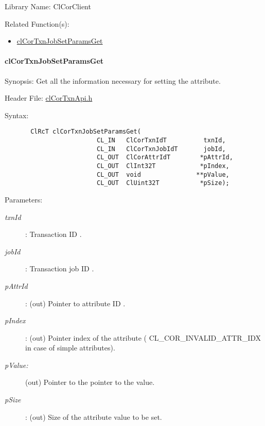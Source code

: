 \begin{Desc}
\item[Library Name:]Cl\-Cor\-Client\end{Desc}
\begin{Desc}
\item[Related Function(s):]\begin{itemize}
\item \hyperlink{group__group13}{cl\-Cor\-Txn\-Job\-Set\-Params\-Get} \end{itemize}
\end{Desc}
\hypertarget{pagecor507}{}\paragraph{cl\-Cor\-Txn\-Job\-Set\-Params\-Get}\label{pagecor507}
\begin{Desc}
\item[Synopsis:]Get all the information necessary for setting the attribute.\end{Desc}
\begin{Desc}
\item[Header File:]\hyperlink{cl_cor_txn_api_8h}{cl\-Cor\-Txn\-Api.h}\end{Desc}
\begin{Desc}
\item[Syntax:]

\footnotesize\begin{verbatim}       ClRcT clCorTxnJobSetParamsGet(
                         CL_IN   ClCorTxnIdT          txnId,
                         CL_IN   ClCorTxnJobIdT       jobId,
                         CL_OUT  ClCorAttrIdT        *pAttrId,
                         CL_OUT  ClInt32T            *pIndex,
                         CL_OUT  void               **pValue,
                         CL_OUT  ClUint32T           *pSize);
\end{verbatim}
\normalsize
\end{Desc}
\begin{Desc}
\item[Parameters:]
\begin{description}
\item[{\em txn\-Id}]: Transaction ID . \item[{\em job\-Id}]: Transaction job ID . \item[{\em p\-Attr\-Id}]: (out) Pointer to attribute ID . \item[{\em p\-Index}]: (out) Pointer index of the attribute ( CL\_\-COR\_\-INVALID\_\-ATTR\_\-IDX in case of simple attributes). \item[{\em p\-Value:}](out) Pointer to the pointer to the value. \item[{\em p\-Size}]: (out) Size of the attribute value to be set.\end{description}
\end{Desc}
